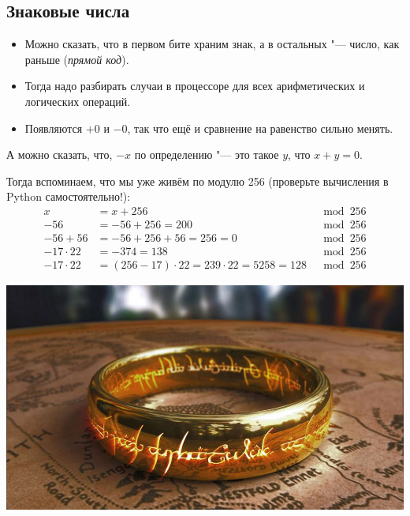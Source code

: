 \subsection{Знаковые числа}

\begin{frame}
\end{frame}

\begin{frame}
	\begin{itemize}
		\item
			Можно сказать, что в первом бите храним знак, а в остальных "--- число, как раньше (\textit{прямой код}).
		\item
			Тогда надо разбирать случаи в процессоре для всех арифметических и логических операций.
		\item
			Появляются $+0$ и $-0$, так что ещё и сравнение на равенство сильно менять.
	\end{itemize}

	А можно сказать, что, $-x$ по определению "--- это такое $y$, что $x+y=0$.

	Тогда вспоминаем, что мы уже живём по модулю 256 (проверьте вычисления в Python самостоятельно!):
	\begin{align*}
		x &= x + 256 &\mod 256 \\
		-56 &= -56 + 256 = 200 &\mod 256 \\
		-56 + 56 &= -56 + 256 + 56 = 256 = 0 &\mod 256 \\
		-17 \cdot 22 &= -374 = 138 &\mod 256 \\
		-17 \cdot 22 &= (256 - 17) \cdot 22 = 239 \cdot 22 = 5258 = 128 &\mod 256
	\end{align*}
\end{frame}

\begin{frame}
	\begin{center}
		\includegraphics[scale=0.3]{one-ring-to-rule.jpg}
	\end{center}
\end{frame}

